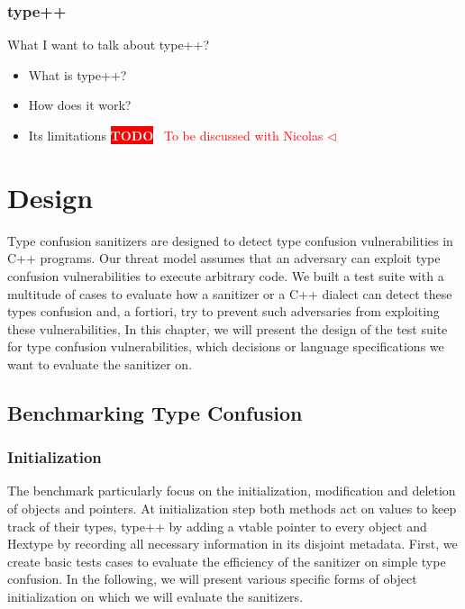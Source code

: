 \documentclass[a4paper,11pt,oneside]{report}
\newcommand{\todobox}[3]{%
       \colorbox{#1}{\textcolor{white}{\sffamily\bfseries\scriptsize #2}}%
       ~\textcolor{#1}{#3} %
       \textcolor{#1}{$\triangleleft$}%
}
\newcommand{\adrbqt}[1]{\todobox{red}{TODO}{#1}}
\begin{document}
\subsection{type++}

What I want to talk about type++?
\begin{itemize}
       \item What is type++?
       \item How does it work?
       \item Its limitations \adrbqt{To be discussed with Nicolas}
\end{itemize}


\chapter{Design}

Type confusion sanitizers are designed to detect type confusion vulnerabilities
in C++ programs.  Our threat model assumes that an adversary can exploit type
confusion vulnerabilities to execute arbitrary code.  We built a test suite with
a multitude of cases to evaluate how a sanitizer or a C++ dialect can detect
these types confusion and, a fortiori, try to prevent such adversaries from
exploiting these vulnerabilities, In this chapter, we will present the design of
the test suite for type confusion vulnerabilities, which decisions or language
specifications we want to evaluate the sanitizer on.

\section{Benchmarking Type Confusion}

\subsection{Initialization}

The benchmark particularly focus on the initialization, modification and
deletion of objects and pointers. At initialization step both methods act on
values to keep track of their types, type++ by adding a vtable pointer to every
object and Hextype by recording all necessary information in its disjoint
metadata.  First, we create basic tests cases to evaluate the efficiency of the
sanitizer on simple type confusion. In the following, we will present various
specific forms of object initialization on which we will evaluate the
sanitizers.
\end{document}
